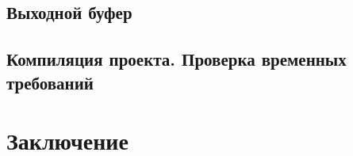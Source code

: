 \subsection{Выходной буфер}

\subsection{Компиляция проекта. Проверка временных требований}

%

\section{Заключение}

